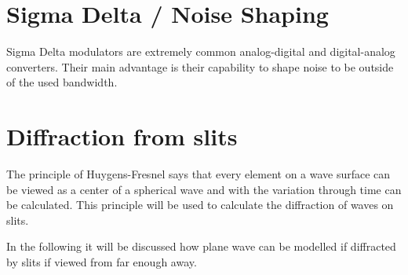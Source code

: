 \section{Sigma Delta / Noise Shaping}
Sigma Delta modulators are extremely common analog-digital and digital-analog converters. Their main advantage is their capability to shape noise to be outside of the used bandwidth.
\section{Diffraction from slits}
The principle of Huygens-Fresnel \cite{physik_skript} says that every element on a wave surface can be viewed as a center of a spherical wave and with the variation through time can be calculated. This principle will be used to calculate the diffraction of waves on slits.

In the following it will be discussed how plane wave can be modelled if diffracted by slits if viewed from far enough away.
